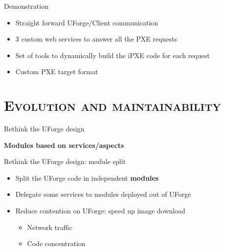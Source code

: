 \documentclass[xcolor=x11names,compress]{beamer}
\renewcommand{\(}{\begin{columns}}
\renewcommand{\)}{\end{columns}}
\newcommand{\<}[1]{\begin{column}{#1}}
\renewcommand{\>}{\end{column}}
\begin{document}
\begin{frame}{Demonstration}
	\begin{itemize}
		\item Straight forward UForge/Client communication
		\item 3 custom web services to answer all the PXE requests
		\item Set of tools to dynamically build the iPXE code for each request
		\item Custom PXE target format
	\end{itemize}
\end{frame}


\section{\scshape Evolution and maintainability}
\frame{\tableofcontents[currentsection]}
\begin{frame}{Rethink the UForge design}

	\textbf{Modules based on services/aspects}
	\begin{figure}[t]
	\begin{center}
	\end{center}
	\end{figure}

\end{frame}


\begin{frame}{Rethink the UForge design: module split}
	\begin{itemize}
		\item Split the UForge code in independent \textbf{modules}
		\item Delegate some services to modules deployed out of UForge
		\item Reduce contention on UForge: speed up image download
        	\begin{itemize}
				\item Network traffic
				\item Code concentration
			\end{itemize}
	\end{itemize}
\end{frame}
\end{document}
